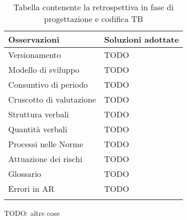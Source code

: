 \documentclass[../piano_di_qualifica.tex]{subfiles}
\begin{document}
\begin{center}
	\begin{longtable}{|p{5cm}|p{10cm}|}
		\hline
		\rowcolor{lightgray}
		\textbf{Osservazioni}   & \textbf{Soluzioni adottate} \\
		\hline
		Versionamento & TODO \\
		Modello di sviluppo & TODO \\
		Consuntivo di periodo & TODO \\
		Cruscotto di valutazione & TODO \\
		Struttura verbali & TODO \\
		Quantità verbali & TODO \\
		Processi nelle Norme & TODO \\
		Attuazione dei rischi & TODO \\
		Glossario & TODO \\
		Errori in AR & TODO \\
		\hline
		\rowcolor{white}
		\caption{Tabella contenente la retrospettiva in fase di progettazione e codifica TB}
	\end{longtable}
\end{center}

TODO: altre cose
\end{document}

